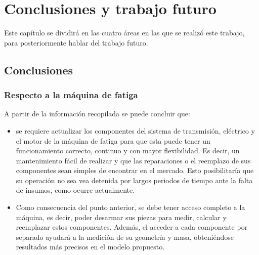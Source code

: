 \chapter{Conclusiones y trabajo futuro}

Este capítulo se dividirá en las cuatro áreas en las que se realizó este trabajo, para posteriormente hablar del trabajo futuro. 

\section{Conclusiones}

\subsection{Respecto a la máquina de fatiga}

A partir de la información recopilada se puede concluir que:
\begin{itemize}
	\item se requiere actualizar los componentes del sistema de transmisión, eléctrico y el motor de la máquina de fatiga para que esta puede tener un funcionamiento correcto, continuo y con mayor flexibilidad. Es decir, un mantenimiento fácil de realizar y que las reparaciones o el reemplazo de sus componentes sean simples de encontrar en el mercado. Esto posibilitaría que su operación no sea vea detenida por largos periodos de tiempo ante la falta de insumos, como ocurre actualmente.
	\item Como consecuencia del punto anterior, se debe tener acceso completo a la máquina, es decir, poder desarmar sus piezas para medir, calcular y reemplazar estos componentes. Además, el acceder a cada componente por separado ayudará a la medición de su geometría y masa, obteniéndose resultados más precisos en el modelo propuesto.
\end{itemize}

\newpage

